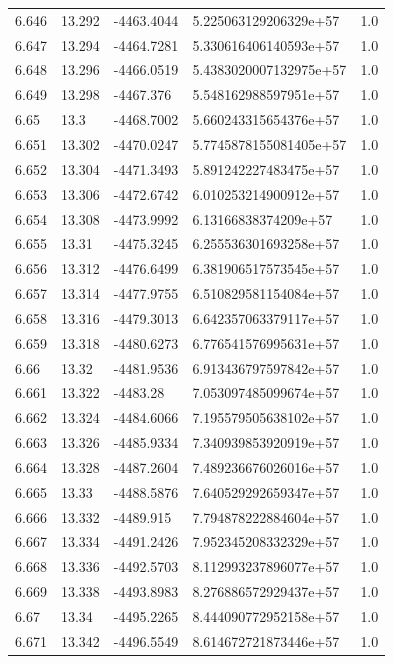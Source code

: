 \begin{tabular}{lllll}
6.646 & 13.292 & -4463.4044 & 5.225063129206329e+57 & 1.0 \\
6.647 & 13.294 & -4464.7281 & 5.330616406140593e+57 & 1.0 \\
6.648 & 13.296 & -4466.0519 & 5.4383020007132975e+57 & 1.0 \\
6.649 & 13.298 & -4467.376 & 5.548162988597951e+57 & 1.0 \\
6.65 & 13.3 & -4468.7002 & 5.660243315654376e+57 & 1.0 \\
6.651 & 13.302 & -4470.0247 & 5.7745878155081405e+57 & 1.0 \\
6.652 & 13.304 & -4471.3493 & 5.891242227483475e+57 & 1.0 \\
6.653 & 13.306 & -4472.6742 & 6.010253214900912e+57 & 1.0 \\
6.654 & 13.308 & -4473.9992 & 6.13166838374209e+57 & 1.0 \\
6.655 & 13.31 & -4475.3245 & 6.255536301693258e+57 & 1.0 \\
6.656 & 13.312 & -4476.6499 & 6.381906517573545e+57 & 1.0 \\
6.657 & 13.314 & -4477.9755 & 6.510829581154084e+57 & 1.0 \\
6.658 & 13.316 & -4479.3013 & 6.642357063379117e+57 & 1.0 \\
6.659 & 13.318 & -4480.6273 & 6.776541576995631e+57 & 1.0 \\
6.66 & 13.32 & -4481.9536 & 6.913436797597842e+57 & 1.0 \\
6.661 & 13.322 & -4483.28 & 7.053097485099674e+57 & 1.0 \\
6.662 & 13.324 & -4484.6066 & 7.195579505638102e+57 & 1.0 \\
6.663 & 13.326 & -4485.9334 & 7.340939853920919e+57 & 1.0 \\
6.664 & 13.328 & -4487.2604 & 7.489236676026016e+57 & 1.0 \\
6.665 & 13.33 & -4488.5876 & 7.640529292659347e+57 & 1.0 \\
6.666 & 13.332 & -4489.915 & 7.794878222884604e+57 & 1.0 \\
6.667 & 13.334 & -4491.2426 & 7.952345208332329e+57 & 1.0 \\
6.668 & 13.336 & -4492.5703 & 8.112993237896077e+57 & 1.0 \\
6.669 & 13.338 & -4493.8983 & 8.276886572929437e+57 & 1.0 \\
6.67 & 13.34 & -4495.2265 & 8.444090772952158e+57 & 1.0 \\
6.671 & 13.342 & -4496.5549 & 8.614672721873446e+57 & 1.0 \\

\end{tabular}
